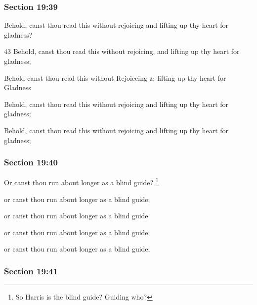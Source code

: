 	\subsubsection{Section 19:39} %
		\label{DC19-39}

		Behold, canst thou read this without rejoicing and lifting up thy heart for gladness?

		\begin{framed}
		\scriptsize
			\begin{compactdesc}
				\item[JSP] 43 Behold, canst thou read this without rejoicing, and lifting up thy heart for gladness;
				\item[RB1] Behold canst thou read this without Rejoiceing \& lifting up thy heart for Gladness
				\item[DC 1835] Behold, canst thou read this without rejoicing and lifting up thy heart for gladness; 
				\item[DC 1844] Behold, canst thou read this without rejoicing and lifting up thy heart for gladness; 
			\end{compactdesc}
		\end{framed}

	\subsubsection{Section 19:40} %
		\label{DC19-40}

		Or canst thou run about longer as a blind guide?%
			\footnote{%
				So Harris is the blind guide? Guiding who?
				}

		\begin{framed}
		\scriptsize
			\begin{compactdesc}
				\item[JSP] or canst thou run about longer as a blind guide;
				\item[RB1] or canst thou run about longer as a blind guide
				\item[DC 1835] or canst thou run about longer as a blind guide; 
				\item[DC 1844] or canst thou run about longer as a blind guide; 
			\end{compactdesc}
		\end{framed}

	\subsubsection{Section 19:41} %
		\label{DC19-41}

